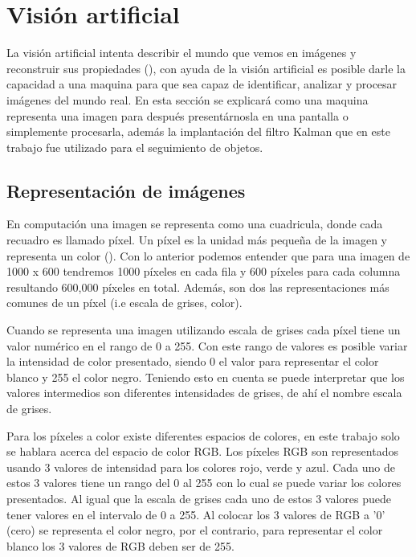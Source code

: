 \section{Visión artificial}

La visión artificial intenta describir el mundo que vemos en imágenes y reconstruir sus propiedades (\cite{szeliski2010computer}), con ayuda de la visión artificial es posible darle la capacidad a una maquina para que sea capaz de identificar, analizar y procesar imágenes del mundo real. En esta sección se explicará como una maquina representa una imagen para después presentárnosla en una pantalla o simplemente procesarla, además la implantación del filtro Kalman que en este trabajo fue utilizado para el seguimiento de objetos.

\subsection{Representación de imágenes}

En computación una imagen se representa como una cuadricula, donde cada recuadro es llamado píxel. Un píxel es la unidad más pequeña de la imagen y representa un color (\cite{rosebrock2017deep}). Con lo anterior podemos entender que para una imagen de 1000 x 600 tendremos 1000 píxeles en cada fila y 600 píxeles para cada columna resultando 600,000 píxeles en total. Además, son dos las representaciones más comunes de un píxel (i.e escala de grises, color).

Cuando se representa una imagen utilizando escala de grises cada píxel tiene un valor numérico en el rango de 0 a 255. Con este rango de valores es posible variar la intensidad de color presentado, siendo 0 el valor para representar el color blanco y 255 el color negro. Teniendo esto en cuenta se puede interpretar que los valores intermedios son diferentes intensidades de grises, de ahí el nombre escala de grises.

Para los píxeles a color existe diferentes espacios de colores, en este trabajo solo se hablara acerca del espacio de color RGB. Los píxeles RGB son representados usando 3 valores de intensidad para los colores rojo, verde y azul. Cada uno de estos 3 valores tiene un rango del 0 al 255 con lo cual se puede variar los colores presentados. Al igual que la escala de grises cada uno de estos 3 valores puede tener valores en el intervalo de 0 a 255. Al colocar los 3 valores de RGB a '0' (cero) se representa el color negro, por el contrario, para representar el color blanco los 3 valores de RGB deben ser de 255.

